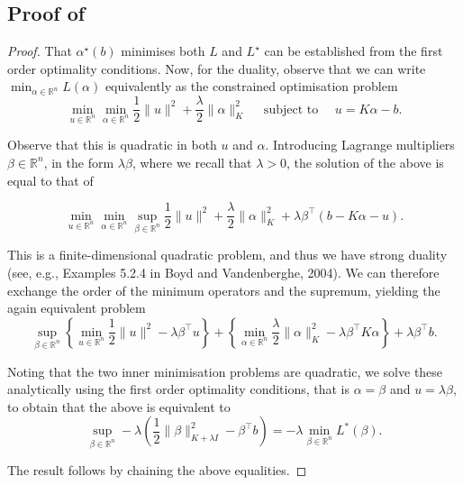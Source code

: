 
\subsection{Proof of }
\label{app:proof_strong_duality}

\begin{proof}
That $\alpha^{\star}(b)$ minimises both $L$ and $L^{\star}$ can be established from the first order optimality conditions. Now, for the duality, observe that we can write $\min _{\alpha \in \mathbb{R}^n} L(\alpha)$ equivalently as the constrained optimisation problem
$$
\min _{u \in \mathbb{R}^n} \min _{\alpha \in \mathbb{R}^n} \frac{1}{2}\|u\|^2+\frac{\lambda}{2}\|\alpha\|_K^2 \quad \text { subject to } \quad u=K \alpha-b.
$$


Observe that this is quadratic in both $u$ and $\alpha$. Introducing Lagrange multipliers $\beta \in \mathbb{R}^n$, in the form $\lambda \beta$, where we recall that $\lambda>0$, the solution of the above is equal to that of

$$
\min _{u \in \mathbb{R}^n} \min _{\alpha \in \mathbb{R}^n} \sup _{\beta \in \mathbb{R}^n} \frac{1}{2}\|u\|^2+\frac{\lambda}{2}\|\alpha\|_K^2+\lambda \beta^{\top}(b-K \alpha-u).
$$

This is a finite-dimensional quadratic problem, and thus we have strong duality (see, e.g., Examples 5.2.4 in Boyd and Vandenberghe, 2004). We can therefore exchange the order of the minimum operators and the supremum, yielding the again equivalent problem
$$
\sup _{\beta \in \mathbb{R}^n}\left\{\min _{u \in \mathbb{R}^n} \frac{1}{2}\|u\|^2-\lambda \beta^{\top} u\right\}+\left\{\min _{\alpha \in \mathbb{R}^n} \frac{\lambda}{2}\|\alpha\|_K^2-\lambda \beta^{\top} K \alpha\right\}+\lambda \beta^{\top} b.
$$

Noting that the two inner minimisation problems are quadratic, we solve these analytically using the first order optimality conditions, that is $\alpha=\beta$ and $u=\lambda \beta$, to obtain that the above is equivalent to
$$
\sup _{\beta \in \mathbb{R}^n}-\lambda\left(\frac{1}{2}\|\beta\|_{K+\lambda I}^2-\beta^{\top} b\right)=-\lambda \min _{\beta \in \mathbb{R}^n} L^*(\beta) .
$$

The result follows by chaining the above equalities.
\end{proof}

